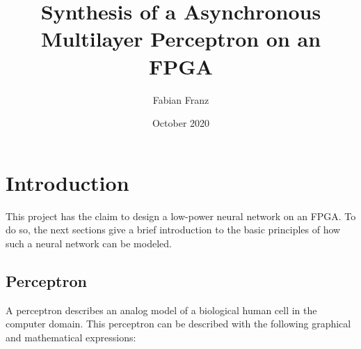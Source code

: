 \documentclass{report}
\title{Synthesis of a Asynchronous Multilayer Perceptron on an FPGA}
\author{Fabian Franz}
\date{October 2020}
\numberwithin{equation}{section}
\begin{document}
\maketitle

\begin{abstract}
\end{abstract}

\chapter{Introduction}
This project has the claim to design a low-power neural network on an FPGA.
To do so, the next sections give a brief introduction to the basic
principles of how such a neural network can be modeled.

\section{Perceptron}
A perceptron describes an analog model of a biological human cell in the
computer domain. This perceptron can be described with the following graphical
and mathematical expressions:
\end{document}
